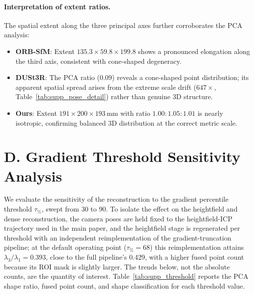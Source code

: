 \documentclass[review]{elsarticle}
\begin{document}
\paragraph{Interpretation of extent ratios.}
The spatial extent along the three principal axes further corroborates the PCA analysis:
\begin{itemize}[noitemsep]
    \item \textbf{ORB-SfM}: Extent $135.3 \times 59.8 \times 199.8$ shows a pronounced elongation along the third axis, consistent with cone-shaped degeneracy.
    \item \textbf{DUSt3R}: The PCA ratio (0.09) reveals a cone-shaped point distribution; its apparent spatial spread arises from the extreme scale drift ($647\times$, Table~\ref{tab:supp_pose_detail}) rather than genuine 3D structure.
    \item \textbf{Ours}: Extent $191 \times 200 \times 193$\,mm with ratio $1.00:1.05:1.01$ is nearly isotropic, confirming balanced 3D distribution at the correct metric scale.
\end{itemize}

\section*{D. Gradient Threshold Sensitivity Analysis}

We evaluate the sensitivity of the reconstruction to the gradient percentile threshold $\tau_{\%}$, swept from 30 to 90. To isolate the effect on the heightfield and dense reconstruction, the camera poses are held fixed to the heightfield-ICP trajectory used in the main paper, and the heightfield stage is regenerated per threshold with an independent reimplementation of the gradient-truncation pipeline; at the default operating point ($\tau_{\%}{=}68$) this reimplementation attains $\lambda_3/\lambda_1 = 0.393$, close to the full pipeline's 0.429, with a higher fused point count because its ROI mask is slightly larger. The trends below, not the absolute counts, are the quantity of interest. Table~\ref{tab:supp_threshold} reports the PCA shape ratio, fused point count, and shape classification for each threshold value.
\end{document}
